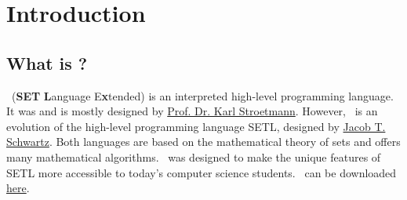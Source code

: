 
\chapter{Introduction}

\section*{What is \setlx?}

	\setlx\ (\textbf{SET} \textbf{L}anguage E\textbf{x}tended) is an interpreted high-level programming language. It was and is mostly designed by \href{https://github.com/karlstroetmann}{Prof. Dr. Karl Stroetmann}. However, \setlx\ is an evolution of the high-level programming language SETL, designed by \href{https://en.wikipedia.org/wiki/Jacob_T._Schwartz}{Jacob T. Schwartz}. Both languages are based on the mathematical theory of sets and offers many mathematical algorithms. \setlx\ was designed to make the unique features of SETL more accessible to today's computer science students. \setlx\ can be downloaded \href{https://randoom.org/Software/SetlX}{here}.